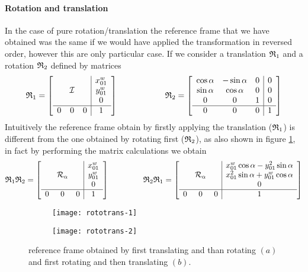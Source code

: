 		\paragraph{Rotation and translation} In the case of pure rotation/translation the reference frame that we have obtained was the same if we would have applied the transformation in reversed order, however this are only particular case. If we consider a translation $\mathfrak {R}_{1}$ and a rotation $\mathfrak {R}_{2}$ defined by matrices
		\[  \mathfrak {R}_{1} = \begin{bmatrix}  \begin{array}{c c c | c}  &&& x_{01}^w \\ & \mathcal I&& y_{01}^w \\ &&& 0 \\ \hline 0 & 0 & 0 & 1  \end{array} \end{bmatrix}  \hspace{2cm} \mathfrak {R}_{2} = \begin{bmatrix}  \begin{array}{c c c | c} \cos \alpha & -\sin \alpha & 0 & 0 \\ \sin\alpha & \cos \alpha & 0 & 0 \\ 0 & 0 & 1 & 0 \\ \hline 0 & 0 & 0 & 1 \end{array} \end{bmatrix} \]
		Intuitively the reference frame obtain by firstly applying the translation ($\mathfrak {R}_{1}$) is different from the one obtained by rotating first ($\mathfrak {R}_{2}$), as also shown in figure \ref{fig:rot:transforder}, in fact by performing the matrix calculations we obtain
		\[ \mathfrak {R}_{1} \mathfrak {R}_{2} = \begin{bmatrix}  \begin{array}{c c c | c}  &&& x_{01}^w \\ &\mathcal R_\alpha && y_{01}^w \\ &&& 0 \\ \hline 0&0&0& 1 \end{array} \end{bmatrix} \hspace{1.5cm} \mathfrak {R}_{2} \mathfrak {R}_{1}  = \begin{bmatrix}  \begin{array}{c c c | c}  &&& x_{01}^w \cos\alpha  - y_{01}^2 \sin\alpha \\ &\mathcal R_\alpha && x_{01}^2 \sin\alpha + y_{01}^w \cos\alpha \\ &&& 0 \\ \hline 0&0&0& 1 \end{array} \end{bmatrix}  \]
		
		\begin{figure}[bht]
			\centering 
			\begin{subfigure}{0.48\linewidth}
				\centering \texttt{[image: rototrans-1]} \caption{}
			\end{subfigure}
			\begin{subfigure}{0.48\linewidth}
				\centering \texttt{[image: rototrans-2]} \caption{}
			\end{subfigure}
			\caption{reference frame obtained by first translating and than rotating $(a)$ and first rotating and then translating $(b)$.} \label{fig:rot:transforder}
		\end{figure}
	
